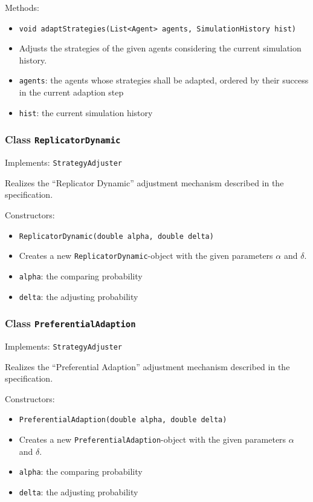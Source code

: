 \documentclass[parskip=full,11pt]{scrartcl}
\begin{document}
Methods:
\begin{itemize}\itemsep -10pt
\item \texttt{void adaptStrategies(List<Agent> agents, SimulationHistory hist)}
\item[] Adjusts the strategies of the given agents considering the current simulation history.
\item[] \texttt{agents}: the agents whose strategies shall be adapted, ordered by their success in the current adaption step
\item[] \texttt{hist}: the current simulation history
\end{itemize}

\subsubsection{Class \texttt{ReplicatorDynamic}}
Implements: \texttt{StrategyAdjuster}

Realizes the \enquote{Replicator Dynamic} adjustment mechanism described in the specification.

Constructors:
\begin{itemize}\itemsep -10pt
\item \texttt{ReplicatorDynamic(double alpha, double delta)}
\item[] Creates a new \texttt{ReplicatorDynamic}-object with the given parameters \(\alpha\) and \(\delta\).
\item[] \texttt{alpha}: the comparing probability
\item[] \texttt{delta}: the adjusting probability
\end{itemize}

\subsubsection{Class \texttt{PreferentialAdaption}}
Implements: \texttt{StrategyAdjuster}

Realizes the \enquote{Preferential Adaption} adjustment mechanism described in the specification.

Constructors:
\begin{itemize}\itemsep -10pt
\item \texttt{PreferentialAdaption(double alpha, double delta)}
\item[] Creates a new \texttt{PreferentialAdaption}-object with the given parameters \(\alpha\) and \(\delta\).
\item[] \texttt{alpha}: the comparing probability
\item[] \texttt{delta}: the adjusting probability
\end{itemize}
\end{document}
